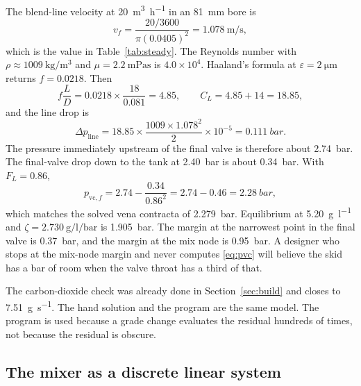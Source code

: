 The blend-line velocity at \SI{20}{\cubic\metre\per\hour} in an \SI{81}{\milli\metre} bore is
\begin{equation}
v_f = \frac{20/3600}{\pi(0.0405)^{2}} = \SI{1.078}{\metre\per\second},
\end{equation}
which is the value in Table~\ref{tab:steady}. The Reynolds number with $\rho\approx\SI{1009}{\kilogram\per\cubic\metre}$ and $\mu=\SI{2.2}{\milli\pascal\second}$ is $4.0\times 10^{4}$. Haaland's formula at $\varepsilon=\SI{2}{\micro\metre}$ returns $f=0.0218$. Then
\begin{equation}
f\frac{L}{D} = 0.0218\times\frac{18}{0.081} = 4.85,
\qquad
C_L = 4.85 + 14 = 18.85,
\end{equation}
and the line drop is
\begin{equation}
\Delta p_{\mathrm{line}} = 18.85\times\frac{1009\times 1.078^{2}}{2}\times 10^{-5} = \SI{0.111}{bar}.
\end{equation}
The pressure immediately upstream of the final valve is therefore about \SI{2.74}{bar}. The final-valve drop down to the tank at \SI{2.40}{bar} is about \SI{0.34}{bar}. With $F_L=0.86$,
\begin{equation}
p_{\mathrm{vc},f} = 2.74 - \frac{0.34}{0.86^{2}} = 2.74 - 0.46 = \SI{2.28}{bar},
\end{equation}
which matches the solved vena contracta of \SI{2.279}{bar}. Equilibrium at \SI{5.20}{\gram\per\litre} and $\zeta=\SI{2.730}{\gram\per\litre\per\bar}$ is \SI{1.905}{bar}. The margin at the narrowest point in the final valve is \SI{0.37}{bar}, and the margin at the mix node is \SI{0.95}{bar}. A designer who stops at the mix-node margin and never computes \eqref{eq:pvc} will believe the skid has a bar of room when the valve throat has a third of that.

The carbon-dioxide check was already done in Section~\ref{sec:build} and closes to \SI{7.51}{\gram\per\second}. The hand solution and the program are the same model. The program is used because a grade change evaluates the residual hundreds of times, not because the residual is obscure.

\subsection{The mixer as a discrete linear system}
\label{sec:discrete}

